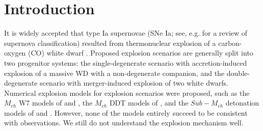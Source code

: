 \documentclass[twocolumn]{aastex631}
\begin{document}

\section{Introduction} \label{sec:intro}

It is widely accepted that type Ia supernovae (SNe Ia; see, e.g. \citealt{1997ARAA..35..309F} for a review of supernova classification) resulted from thermonuclear explosion of a carbon-oxygen (CO) white dwarf \citep{1997Sci...276.1378N,2000ARAA..38..191H,2014ARAA..52..107M}. Proposed explosion scenarios are generally split into two progenitor systems: the single-degenerate scenario \citep{1973ApJ...186.1007W} with accretion-induced explosion of a massive WD with a non-degenerate companion, and the double-degenerate \citep{1984ApJS...54..335I,1984ApJ...277..355W} scenario with merger-induced explosion of two white dwarfs. Numerical explosion models for explosion scenarios were proposed, such as the $M_{ch}$ W7 models of \citet{1997NuPhA.621..467N} and \citet{1999ApJS..125..439I}, the $M_{ch}$ DDT models of \citet{2013MNRAS.429.1156S}, and the $Sub-M_{ch}$ detonation models of \citet{2010ApJ...714L..52S} and \citet{2018ApJ...854...52S}. However, none of the models entirely succeed to be consistent with observations. We still do not understand the explosion mechanism well.
\end{document}
